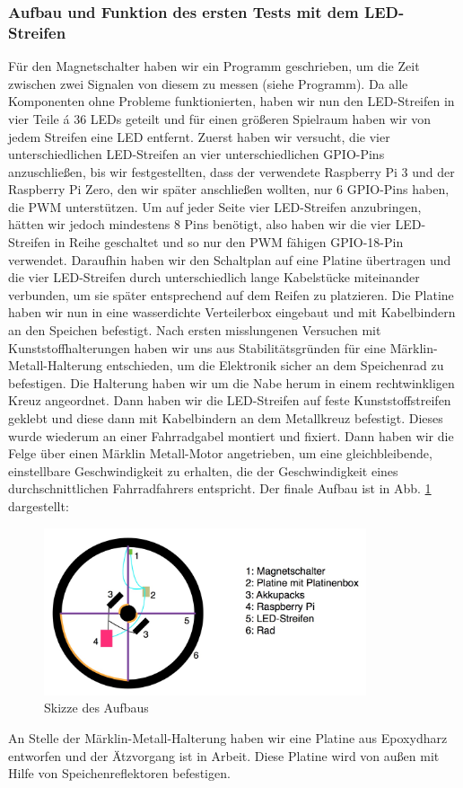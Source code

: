 \documentclass [a4paper, 11pt] {article}
\begin{document}
\subsubsection{Aufbau und Funktion des ersten Tests mit dem LED-Streifen}
Für den Magnetschalter haben wir ein Programm geschrieben, um die Zeit zwischen zwei Signalen von diesem zu messen (siehe Programm).
Da alle Komponenten ohne Probleme funktionierten, haben wir nun den LED-Streifen in vier Teile á 36 LEDs geteilt und für einen größeren Spielraum haben wir von jedem Streifen eine LED entfernt. Zuerst haben wir versucht, die vier unterschiedlichen LED-Streifen an vier unterschiedlichen GPIO-Pins anzuschließen, bis wir festgestellten, dass der verwendete Raspberry Pi 3 und der Raspberry Pi Zero, den wir später anschließen wollten, nur 6 GPIO-Pins haben, die PWM unterstützen. Um auf jeder Seite vier LED-Streifen anzubringen, hätten wir jedoch mindestens 8 Pins benötigt, also haben wir die vier LED-Streifen in Reihe geschaltet und so nur den PWM fähigen GPIO-18-Pin verwendet.
Daraufhin haben wir den Schaltplan auf eine Platine übertragen und die vier LED-Streifen durch unterschiedlich lange Kabelstücke miteinander verbunden, um sie später entsprechend auf dem Reifen zu platzieren. Die Platine haben wir nun in eine wasserdichte Verteilerbox eingebaut und mit Kabelbindern an den Speichen befestigt.
Nach ersten misslungenen Versuchen mit Kunststoffhalterungen haben wir uns aus Stabilitätsgründen für eine Märklin-Metall-Halterung entschieden, um die Elektronik sicher an dem Speichenrad zu befestigen. Die Halterung haben wir um die Nabe herum in einem rechtwinkligen Kreuz angeordnet. Dann haben wir die LED-Streifen auf feste Kunststoffstreifen geklebt und diese dann mit Kabelbindern an dem Metallkreuz befestigt. Dieses wurde wiederum an einer Fahrradgabel montiert und fixiert. Dann haben wir die Felge über einen Märklin Metall-Motor angetrieben, um eine gleichbleibende, einstellbare Geschwindigkeit zu erhalten, die der Geschwindigkeit eines durchschnittlichen Fahrradfahrers entspricht. Der finale Aufbau ist in Abb. \ref{Skizze} dargestellt:
\begin{figure}[H]
	\centering
	\includegraphics[width=9.5cm]{Rad.png}
	\caption{Skizze des Aufbaus}
	\label{Skizze}
\end{figure}
An Stelle der Märklin-Metall-Halterung haben wir eine Platine aus Epoxydharz entworfen und der Ätzvorgang ist in Arbeit. Diese Platine wird von außen mit Hilfe von Speichenreflektoren befestigen.  
\end{document}
